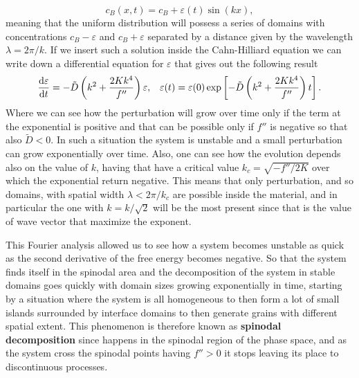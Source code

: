 \begin{equation}
    c_B (x, t) = c_B + \varepsilon(t)\sin(kx),
\end{equation}
meaning that the uniform distribution will possess a series of domains with concentrations $c_B -\varepsilon$ and $c_B + \varepsilon$ separated by a distance given by the wavelength $\lambda = 2\pi/k$. If we insert such a solution inside the Cahn-Hilliard equation we can write down a differential equation for $\varepsilon$ that gives out the following result
\begin{align}
    &\dv{\varepsilon}{t} = -\tilde{D}\left( k^2 + \frac{2Kk^4}{f''} \right)\varepsilon, &\varepsilon(t) =\varepsilon(0) \exp\left[ -\tilde{D}\left( k^2 + \frac{2Kk^4}{f''} \right) t \right]. 
\end{align}
Where we can see how the perturbation will grow over time only if the term at the exponential is positive and that can be possible only if $f''$ is negative so that also $\tilde{D} < 0$. In such a situation the system is unstable and a small perturbation can grow exponentially over time. Also, one can see how the evolution depends also on the value of $k$, having that have a critical value $k_c = \sqrt{-f''/2K}$ over which the exponential return negative. This means that only perturbation, and so domains, with spatial width $\lambda < 2\pi/k_c$ are possible inside the material, and in particular the one with $k = k/\sqrt{2}$ will be the most present since that is the value of wave vector that maximize the exponent.

This Fourier analysis allowed us to see how a system becomes unstable as quick as the second derivative of the free energy becomes negative. So that the system finds itself in the spinodal area and the decomposition of the system in stable domains goes quickly with domain sizes growing exponentially in time, starting by a situation where the system is all homogeneous to then form a lot of small islands surrounded by interface domains to then generate grains with different spatial extent. This phenomenon is therefore known as \textbf{spinodal decomposition} since happens in the spinodal region of the phase space, and as the system cross the spinodal points having $f'' > 0$ it stops leaving its place to discontinuous processes.

